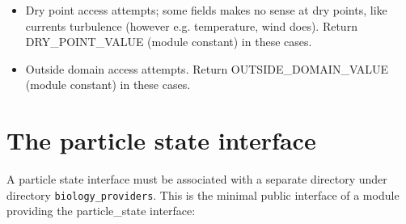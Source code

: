 \begin{itemize}

    \item Dry point access attempts; some fields makes no sense at dry points, like currents
          turbulence (however e.g. temperature, wind does). Return DRY\_POINT\_VALUE (module constant)
          in these cases.

    \item Outside domain access attempts. Return OUTSIDE\_DOMAIN\_VALUE (module constant)
          in these cases.

\end{itemize}

\section{The particle state interface}

A particle state interface
must be associated with a separate directory under directory {\tt biology\_providers}.
This is the minimal public interface of a module providing
the particle\_state interface:

